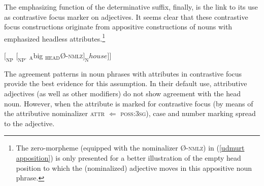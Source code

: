 The emphasizing function of the determinative suffix, finally, is the link to its use as contrastive focus marker on adjectives. It seems clear that these contrastive focus constructions originate from appositive constructions of nouns with emphasized headless attributes.\footnote{The zero-morpheme (equipped with the nominalizer Ø-\textsc{nmlz}) in (\ref{udmurt apposition}) is only presented for a better illustration of the empty head position to which the (nominalized) adjective moves in this appositive noun phrase.}
\begin{exe} \label{udmurt apposition}
\ex {\upshape [}\textsubscript{NP} {\upshape [}\textsubscript{NP'} \textsubscript{A}big \textsubscript{HEAD}Ø-\textsc{nmlz}{\upshape ]} \textsubscript{N}house{\upshape ]]}
\end{exe}
\begin{exe}
\ex $[_{\text{NP}}$ $[_{\text{NP'}}$ $_{\text{A}}$big $_{\text{HEAD}}$Ø-\textsc{nmlz}$] _{}house]]$
\end{exe}
The agreement patterns in noun phrases with attributes in contrastive focus provide the best evidence for this assumption. In their default use, attributive adjectives (as well as other modifiers) do not show agreement with the head noun. However, when the attribute is marked for contrastive focus (by means of the attributive nominalizer \textsc{attr} $\Leftarrow$ \textsc{poss:3sg}), case and number marking spread to the adjective.

